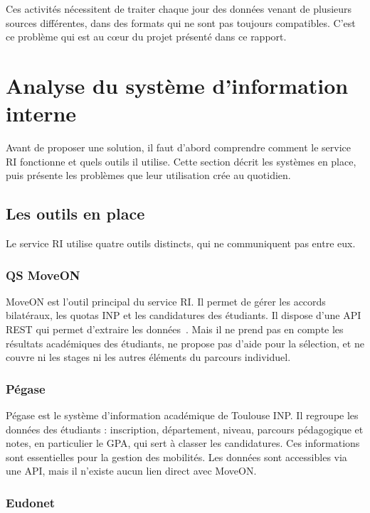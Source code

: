 Ces activités nécessitent de traiter chaque jour des données venant de plusieurs sources différentes, dans des formats qui ne sont pas toujours compatibles. C'est ce problème qui est au cœur du projet présenté dans ce rapport.

\section{Analyse du système d'information interne}

Avant de proposer une solution, il faut d'abord comprendre comment le service RI fonctionne et quels outils il utilise. Cette section décrit les systèmes en place, puis présente les problèmes que leur utilisation crée au quotidien.

\subsection{Les outils en place}

Le service RI utilise quatre outils distincts, qui ne communiquent pas entre eux.

\subsubsection{QS MoveON}

MoveON est l'outil principal du service RI. Il permet de gérer les accords bilatéraux, les quotas INP et les candidatures des étudiants. Il dispose d'une API REST qui permet d'extraire les données~\cite{qs_moveon}. Mais il ne prend pas en compte les résultats académiques des étudiants, ne propose pas d'aide pour la sélection, et ne couvre ni les stages ni les autres éléments du parcours individuel.

\subsubsection{Pégase}

Pégase est le système d'information académique de Toulouse INP. Il regroupe les données des étudiants : inscription, département, niveau, parcours pédagogique et notes, en particulier le GPA, qui sert à classer les candidatures. Ces informations sont essentielles pour la gestion des mobilités. Les données sont accessibles via une API, mais il n'existe aucun lien direct avec MoveON.

\subsubsection{Eudonet}


